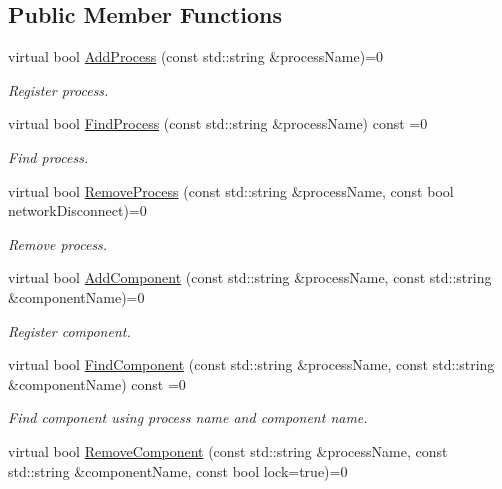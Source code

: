 \subsection*{Public Member Functions}
\begin{DoxyCompactItemize}
\item 
virtual bool \hyperlink{classmts_manager_global_interface_aab43e5975da509676e538ccea5a2612f}{Add\+Process} (const std\+::string \&process\+Name)=0
\begin{DoxyCompactList}\small\item\em Register process. \end{DoxyCompactList}\item 
virtual bool \hyperlink{classmts_manager_global_interface_ad13f404148109b90cd5ba6a886451e1a}{Find\+Process} (const std\+::string \&process\+Name) const =0
\begin{DoxyCompactList}\small\item\em Find process. \end{DoxyCompactList}\item 
virtual bool \hyperlink{classmts_manager_global_interface_a7ae020b18faaf5e27e3be93a43341969}{Remove\+Process} (const std\+::string \&process\+Name, const bool network\+Disconnect)=0
\begin{DoxyCompactList}\small\item\em Remove process. \end{DoxyCompactList}\item 
virtual bool \hyperlink{classmts_manager_global_interface_a2f31e91de48706864619b22bf3aeb227}{Add\+Component} (const std\+::string \&process\+Name, const std\+::string \&component\+Name)=0
\begin{DoxyCompactList}\small\item\em Register component. \end{DoxyCompactList}\item 
virtual bool \hyperlink{classmts_manager_global_interface_a9f839e7759c4cea8e013af38ffcb4708}{Find\+Component} (const std\+::string \&process\+Name, const std\+::string \&component\+Name) const =0
\begin{DoxyCompactList}\small\item\em Find component using process name and component name. \end{DoxyCompactList}\item 
virtual bool \hyperlink{classmts_manager_global_interface_a21dd4efb05af38dc6a47fd9d57382ecb}{Remove\+Component} (const std\+::string \&process\+Name, const std\+::string \&component\+Name, const bool lock=true)=0

\end{DoxyCompactItemize}
